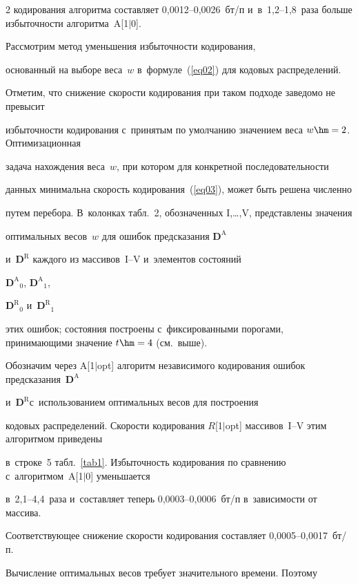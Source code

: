 \begin{multicols}{2}
кодирования алгоритма составляет 0,0012--0,0026~бт/п и~в~1,2--1,8~раза больше избыточности алгоритма~A[1$\vert$0].



Рассмотрим метод уменьшения избыточности кодирования, 

основанный на выборе веса~$w$ в~формуле~(\ref{eq02}) для кодовых распределений. 

Отметим, что снижение скорости кодирования при таком подходе заведомо не превысит 

избыточности кодирования с~принятым по умолчанию значением веса $w\hm=2$. Оптимизационная 

задача нахождения веса~$w$, при котором для конкретной последовательности 

данных минимальна скорость кодирования~(\ref{eq03}), может быть решена численно 

путем перебора. В~колонках табл.~2, обозначенных I,\dots,V, представлены значения 

оптимальных весов~$w$ для ошибок предсказания $\mathbf{D}^\text{A}$ 

и~$\mathbf{D}^\text{R}$ каждого из массивов~I--V и~элементов состояний 

${\mathbf{D}^\text{A}}_0$, ${\mathbf{D}^\text{A}}_1$,

${\mathbf{D}^\text{R}}_0$ и~${\mathbf{D}^\text{R}}_1$

этих ошибок; состояния построены с~фиксированными порогами,  принимающими значение $t\hm=4$ (см.\ выше).





Обозначим через A[1$\vert$opt] алгоритм независимого кодирования ошибок предсказания~$\mathbf{D}^\text{A}$

и~$\mathbf{D}^\text{R}$\linebreak с~использованием оптимальных весов для по\-строения 

 кодовых распределений. Скорости кодирования $R$[1$\vert$opt] массивов~I--V этим алгоритмом \mbox{приведены} 

 в~строке~5 табл.~\ref{tab1}. Избыточность кодирования по сравнению с~алгоритмом~A[1$\vert$0] уменьшается 

 в~2,1--4,4~раза и~составляет теперь 0,0003--0,0006~бт/п в~зависимости от массива. 

 \mbox{Соответствующее} снижение скорости кодирования составляет 0,0005--0,0017~бт/п.



Вычисление оптимальных весов требует значительного времени. Поэтому 


\end{multicols}
